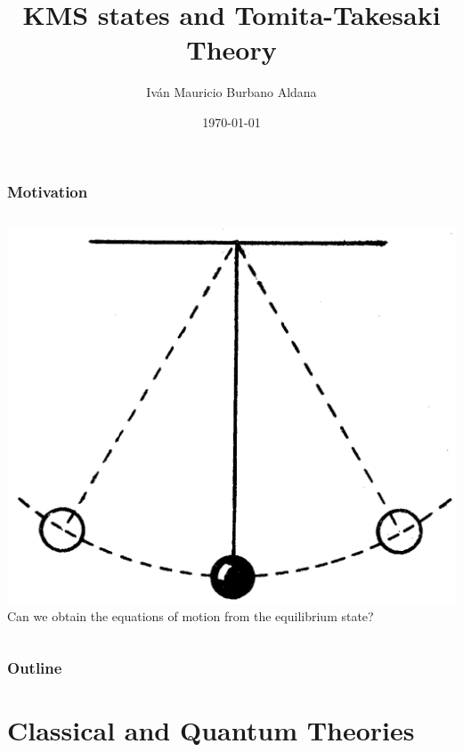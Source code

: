 \documentclass{beamer}
\title{KMS states and Tomita-Takesaki Theory}
\author[Iván Burbano]{Iván Mauricio Burbano Aldana}
\institute{Universidad de los Andes}
\date{\today}
\begin{document}
\begin{frame}
	\titlepage
\end{frame}

\begin{frame}
	\frametitle{Motivation}
	\begin{columns}
		\includegraphics[width=\textwidth]{images/pendulum.png}
		Can we obtain the equations of motion from the equilibrium state?
		\vspace{1cm}
		
	\end{columns}
\end{frame}

\begin{frame}
	\frametitle{Outline}
	\tableofcontents
\end{frame}

\section{Classical and Quantum Theories}
\end{document}
